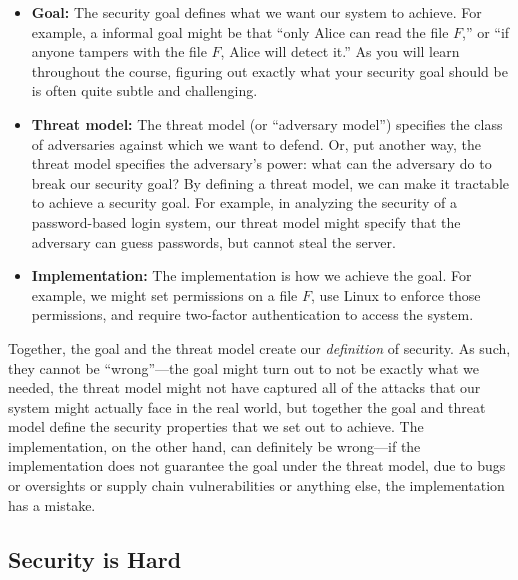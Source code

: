 \begin{itemize}
  \item \textbf{Goal:} 
    The security goal defines what we want our system to achieve.
    For example, a informal goal might be that ``only Alice can read the file $F$,''
    or ``if anyone tampers with the file $F$, Alice will detect it.''
    As you will learn throughout the course, figuring out exactly what your
    security goal should be is often quite subtle and challenging.

  \item \textbf{Threat model:} 
    The threat model (or ``adversary model'') specifies the class of 
    adversaries against which we want to defend.
    Or, put another way, the threat model specifies the adversary's power:
    what can the adversary do to break our security goal?
    By defining a threat model, we can make it
    tractable to achieve a security goal. 
    For example, in analyzing the security of a password-based login system,
    our threat model might specify that 
    the adversary can guess passwords, but cannot steal the server.
  \item \textbf{Implementation:}
    The implementation is how we achieve the goal.
    For example, we might set permissions on a file $F$, 
    use Linux to enforce those permissions, 
    and require two-factor authentication to access the system.
\end{itemize}

Together, the goal and the threat model create our
\textit{definition} of security.
As such, they
cannot be ``wrong''---the goal might turn out to
not be exactly what we needed, 
the threat model might not have captured all of
the attacks that our system might actually face
in the real world, 
but together the goal and threat model define 
the security properties that we set out to achieve.
The implementation, on the other hand, can definitely be wrong---if 
the implementation does not guarantee the goal under the threat model, due to bugs or oversights or supply chain vulnerabilities or anything else, the implementation has a mistake.

\subsection{Security is Hard}

